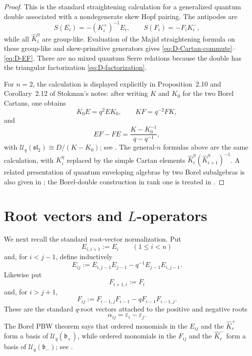 \documentclass[11pt]{amsart}
\numberwithin{equation}{section}
\theoremstyle{definition}
\theoremstyle{remark}
\newcommand{\Uc}{\mathcal{U}}
\newcommand{\fb}{\mathfrak{b}}
\begin{document}
\begin{proof}
This is the standard straightening calculation for a generalized quantum
double associated with a nondegenerate skew Hopf pairing.  The antipodes are
\[
S(E_i)=-(K_i^{+})^{-1}E_i,
\qquad
S(F_i)=-F_iK_i^{-},
\]
while all \(\widehat K_i^{\eta}\) are group-like.  Evaluation of the Majid
straightening formula on these group-like and skew-primitive generators gives
\eqref{eq:D-Cartan-commute}--\eqref{eq:D-EF}.  There are no mixed quantum
Serre relations because the double has the triangular factorization
\eqref{eq:D-factorization}.

For \(n=2\), the calculation is displayed explicitly in Proposition~2.10 and
Corollary~2.12 of Stokman's notes: after writing \(K\) and \(K_0\) for the two
Borel Cartans, one obtains
\[
K_0E=q^2EK_0,\qquad KF=q^{-2}FK,
\]
and
\[
EF-FE=\frac{K-K_0^{-1}}{q-q^{-1}},
\]
with \(\Uc_q(\mathfrak{sl}_2)\cong D/(K-K_0)\); see
\cite{StokmanDouble,StokmanSL2}.  The general-\(n\) formulas above are the
same calculation, with \(K_i^{\eta}\) replaced by the simple Cartan elements
\(\widehat K_i^{\eta}(\widehat K_{i+1}^{\eta})^{-1}\).  A related presentation
of quantum enveloping algebras by two Borel subalgebras is also given in
\cite{BB}; the Borel-double construction in rank one is treated in
\cite{BorelDouble}.
\end{proof}

\section{Root vectors and \(L\)-operators}

We next recall the standard root-vector normalization.  Put
\[
E_{i,i+1}:=E_i\qquad(1\le i<n)
\]
and, for \(i<j-1\), define inductively
\begin{equation}\label{eq:E-root}
E_{ij}:=E_{i,j-1}E_{j-1}
       -q^{-1}E_{j-1}E_{i,j-1}.
\end{equation}
Likewise put
\[
F_{i+1,i}:=F_i
\]
and, for \(i>j+1\),
\begin{equation}\label{eq:F-root}
F_{ij}:=F_{i-1,j}F_{i-1}
       -qF_{i-1}F_{i-1,j}.
\end{equation}
These are the standard \(q\)-root vectors attached to the positive and negative
roots
\[
\alpha_{ij}=\varepsilon_i-\varepsilon_j.
\]
The Borel PBW theorem says that ordered monomials in the \(E_{ij}\) and the
\(\widehat K_r^{+}\) form a basis of \(\Uc_q(\fb_+)\), while ordered monomials
in the \(F_{ij}\) and the \(\widehat K_r^{-}\) form a basis of
\(\Uc_q(\fb_-)\); see \cite[Chapter~6]{KS}.
\end{document}
